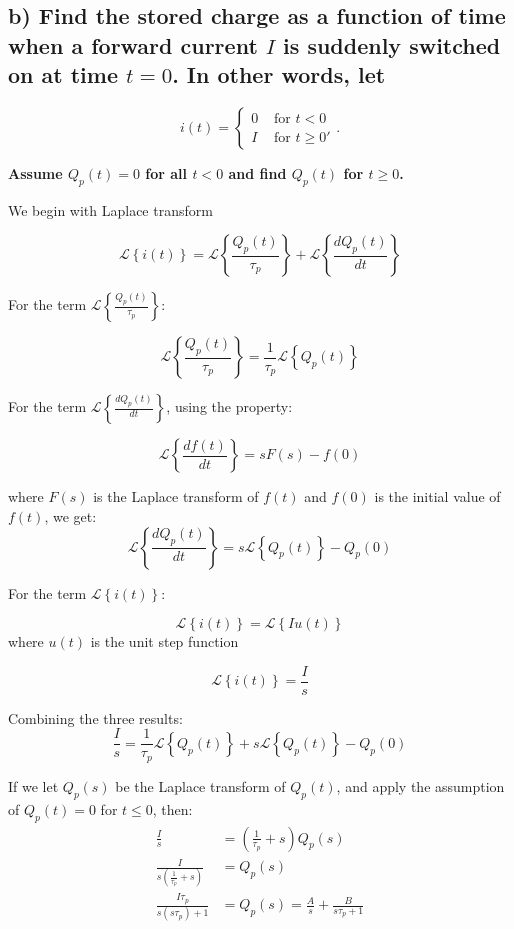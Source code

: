 \subsection*{b) Find the stored charge as a function of time when a forward current $I$ is suddenly switched on at time $t=0$. In other words, let }
$$ i(t)=\left\{
    \begin{array}{ll} 
        0 & \text { for } t<0 \\ 
        I & \text { for } t \geq 0 '
\end{array} .\right. $$

\textbf{Assume $Q_p(t)=0$ for all $t<0$ and find $Q_p(t)$ for $t \geq 0$. }

 We begin with Laplace transform

$$
\mathscr{L}\left\{i(t)\right\}=\mathscr{L}\left\{\frac{Q_p(t)}{\tau_p}\right\}+\mathscr{L}\left\{\frac{d Q_p(t)}{d t}\right\}
$$

For the term $\mathscr{L}\left\{\frac{Q_p(t)}{\tau_p}\right\}$:

$$
\mathscr{L}\left\{\frac{Q_p(t)}{\tau_p}\right\}=\frac{1}{\tau_p} \mathscr{L}\left\{Q_p(t)\right\}
$$

For the term $\mathscr{L}\left\{\frac{d Q_p(t)}{d t}\right\}$, using the property:

$$
\mathcal{L}\left\{\frac{d f(t)}{d t}\right\}=sF(s)-f(0)
$$

where $F(s)$ is the Laplace transform of $f(t)$ and $f(0)$ is the initial value of $f(t)$, we get:
$$
\mathcal{L}\left\{\frac{d Q_p(t)}{d t}\right\}=s \mathcal{L}\left\{Q_p(t)\right\}-Q_p(0)
$$

For the term $\mathscr{L}\left\{i(t)\right\}$:

$$
\mathscr{L}\left\{i(t)\right\}= \mathscr{L}\left\{I u(t)\right\}
$$
where $u(t)$ is the unit step function

$$
\mathscr{L}\left\{i(t)\right\}= \frac{I}{s}
$$


Combining the three results:
$$
\frac{I}{s}=\frac{1}{\tau_p} \mathcal{L}\left\{Q_p(t)\right\}+s \mathcal{L}\left\{Q_p(t)\right\}-Q_p(0)
$$

If we let $Q_p(s)$ be the Laplace transform of $Q_p(t)$, and apply the assumption of $Q_p(t)=0$ for $t\leq0$, then:
\begin{align*}
    \frac{I}{s}&=\left(\frac{1}{\tau_p} +s \right) Q_p(s)\\
    \frac{I}{s\left(\frac{1}{\tau_p} +s \right) }&=Q_p(s)\\
    \frac{I\tau_p}{s(s\tau_p)+1}&=Q_p(s)=\frac{A}{s}+\frac{B}{s\tau_p+1}
\end{align*}


